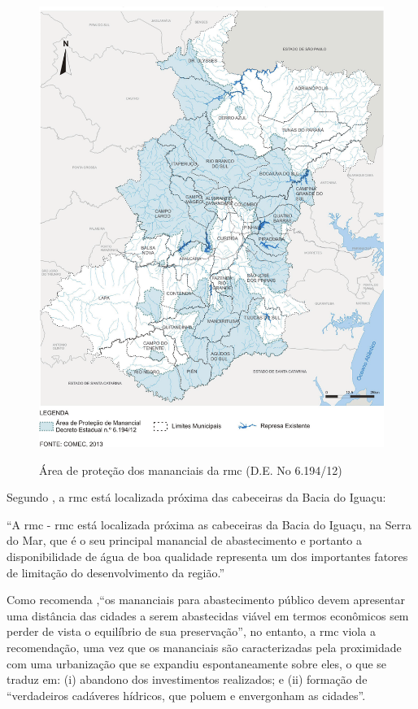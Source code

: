 	\begin{figure}
		\centering
		\caption{Área de proteção dos mananciais da \gls{rmc} (D.E. No 6.194/12)}
		\includegraphics[width=1.0\linewidth]{img/kornin2014a_01}
		\label{fig:kornin2014a_01}
	\end{figure}

	Segundo , a \gls{rmc} está localizada próxima das cabeceiras da Bacia do Iguaçu:
	
	\begin{citacao}
		``A \glsdesc{rmc} - \gls{rmc} está localizada próxima as cabeceiras da Bacia do Iguaçu, na Serra do Mar, que é o seu principal manancial de abastecimento e portanto a disponibilidade de água de boa qualidade representa um dos importantes fatores de limitação do desenvolvimento da região.''
	\end{citacao}

	Como recomenda \cite[p. 6]{andreoli1999a},``os mananciais para abastecimento público devem apresentar uma distância das cidades a serem abastecidas viável em termos econômicos sem perder de vista o equilíbrio de sua preservação'', no entanto, a \gls{rmc} viola a recomendação, uma vez que os mananciais são caracterizadas pela proximidade com uma urbanização que se expandiu espontaneamente sobre eles, o que se traduz em: (i) abandono dos investimentos realizados; e (ii) formação de ``verdadeiros cadáveres hídricos, que poluem e envergonham as cidades''.

